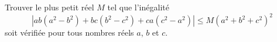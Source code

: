 Trouver le plus petit réel $M$ tel que l'inégalité
\[
\left|ab(a^2 - b^2) + bc(b^2 - c^2) + ca(c^2 - a^2)\right| \leq M(a^2 + b^2 + c^2)^2
\]
soit vérifiée pour tous nombres réels $a$, $b$ et $c$.
